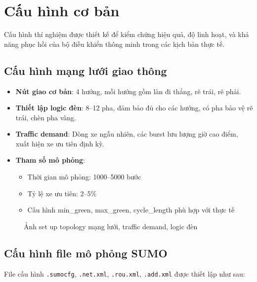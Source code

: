 \section{Cấu hình cơ bản}

Cấu hình thí nghiệm được thiết kế để kiểm chứng hiệu quả, độ linh hoạt, và khả năng phục hồi của bộ điều khiển thông minh trong các kịch bản thực tế.

\subsection{Cấu hình mạng lưới giao thông}

\begin{itemize}
    \item \textbf{Nút giao cơ bản}: 4 hướng, mỗi hướng gồm làn đi thẳng, rẽ trái, rẽ phải.
    \item \textbf{Thiết lập logic đèn}: 8–12 pha, đảm bảo đủ cho các hướng, có pha bảo vệ rẽ trái, chèn pha vàng.
    \item \textbf{Traffic demand}: Dòng xe ngẫu nhiên, các burst lưu lượng giờ cao điểm, xuất hiện xe ưu tiên định kỳ.
    \item \textbf{Tham số mô phỏng}: 
        \begin{itemize}
            \item Thời gian mô phỏng: 1000–5000 bước
            \item Tỷ lệ xe ưu tiên: 2–5\%
            \item Cấu hình min\_green, max\_green, cycle\_length phù hợp với thực tế
        \end{itemize}
\end{itemize}

\begin{figure}[H]
    \centering
    \caption{Ảnh set up topology mạng lưới, traffic demand, logic đèn}
    \label{fig:sumo_network_config}
\end{figure}

\subsection{Cấu hình file mô phỏng SUMO}

File cấu hình \texttt{.sumocfg}, \texttt{.net.xml}, \texttt{.rou.xml}, \texttt{.add.xml} được thiết lập như sau:

